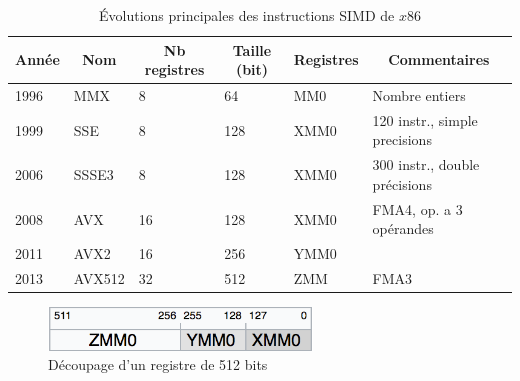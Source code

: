 \begin{table}[]
\centering
\caption{Évolutions principales des instructions SIMD de $x86$}
\label{tab_simd}
\begin{tabular}{|l|l|l|l|l|l|}
\hline
\multicolumn{1}{|c|}{\textbf{Année}} & \multicolumn{1}{c|}{\textbf{Nom}} & \multicolumn{1}{c|}{\textbf{Nb registres}} & \multicolumn{1}{c|}{\textbf{Taille (bit)}} & \multicolumn{1}{c|}{\textbf{Registres}} & \multicolumn{1}{c|}{\textbf{Commentaires}} \\ \hline
1996                                 & MMX                               & 8                                          & 64                                         & MM0                                     & Nombre entiers
\\ \hline
1999                                 & SSE                               & 8                                          & 128                                        & XMM0                                    & 120 instr., simple precisions              \\ \hline
2006                                 & SSSE3                             & 8                                          & 128                                        & XMM0                                    & 300 instr., double précisions              \\ \hline
2008                                 & AVX                               & 16                                         & 128                                        & XMM0                                    & FMA4, op. a 3 opérandes                    \\ \hline
2011                                 & AVX2                              &  16                                          & 256                                        & YMM0                                    &                                            \\ \hline
2013                                 & AVX512                            & 32                                         & 512                                        & ZMM                                     & FMA3                                       \\ \hline
\end{tabular}
\end{table}

\begin{figure}
    \center
    \includegraphics[width=7cm]{images/Chapitre1/simd_registres.png}
    \caption{\label{pic_simd_registres} Découpage d'un registre de 512 bits}
\end{figure}


